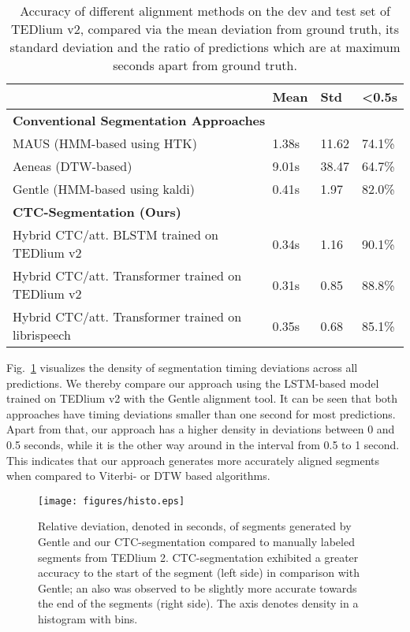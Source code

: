 \documentclass[runningheads]{llncs}
\begin{document}
\begin{table}[tpb]
	\centering
	\caption{Accuracy of different alignment methods on the dev and test set of TEDlium v2,
	compared via the mean deviation from ground truth, its standard deviation and the ratio of predictions which are at maximum  seconds apart from ground truth.}
	\begin{tabular}{l |l |l| l}\toprule
    & \textbf{Mean} & \textbf{Std} & \textbf{<0.5s}  \\ 
    \midrule
    \multicolumn{4}{l}{\textbf{Conventional Segmentation Approaches}} \\
    \midrule
	MAUS (HMM-based using HTK) & 1.38s & 11.62 & 74.1\% \\
	Aeneas (DTW-based) & 9.01s & 38.47 & 64.7\% \\
	Gentle (HMM-based using kaldi) & 0.41s & 1.97 & 82.0\% \\ 
	\midrule
	\multicolumn{4}{l}{\textbf{CTC-Segmentation (Ours)}} \\
    \midrule
	Hybrid CTC/att. BLSTM trained on TEDlium v2 & 0.34s & 1.16 & 90.1\% \\
	Hybrid CTC/att. Transformer trained on TEDlium v2 & 0.31s & 0.85 & 88.8\% \\
	Hybrid CTC/att. Transformer trained on librispeech & 0.35s & 0.68 & 85.1\% \\
	\bottomrule 
    \end{tabular}
	\label{table:align_results}
\end{table}

Fig.~\ref{fig:alignment_density} visualizes the density of segmentation timing deviations across all predictions.
We thereby compare our approach using the LSTM-based model trained on TEDlium v2 with the Gentle alignment tool.
It can be seen that both approaches have timing deviations smaller than one second for most predictions.
Apart from that, our approach has a higher density in deviations between 0 and 0.5 seconds, while it is the other way around in the interval from 0.5 to 1 second.
This indicates that our approach generates more accurately aligned segments when compared to Viterbi- or DTW based algorithms.
\begin{figure}[tbp]
  \centering
  \texttt{[image: figures/histo.eps]}
  \caption{Relative deviation, denoted in seconds, of segments generated by Gentle and our CTC-segmentation compared to manually labeled segments from TEDlium 2.
  CTC-segmentation exhibited a greater accuracy to the start of the segment (left side) in comparison with Gentle;
  an also was observed to be slightly more accurate towards the end of the segments (right side).
  The  axis denotes density in a histogram with  bins.}
  \label{fig:alignment_density}
\end{figure}
\end{document}
